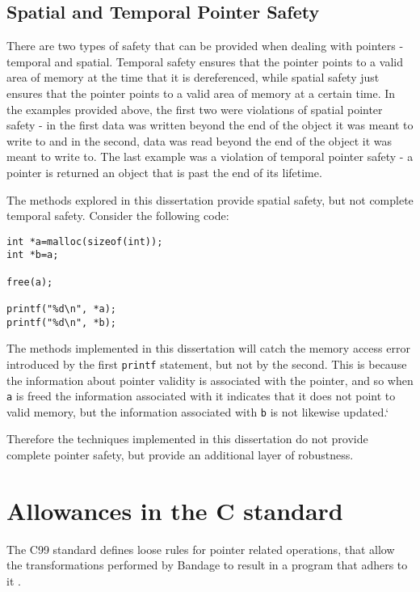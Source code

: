 \subsection{Spatial and Temporal Pointer Safety}

There are two types of safety that can be provided when dealing with pointers - temporal and spatial.
Temporal safety ensures that the pointer points to a valid area of memory at the time that it is dereferenced, while spatial safety just ensures that the pointer points to a valid area of memory at a certain time.
In the examples provided above, the first two were violations of spatial pointer safety - in the first data was written beyond the end of the object it was meant to write to and in the second, data was read beyond the end of the object it was meant to write to.
The last example was a violation of temporal pointer safety - a pointer is returned an object that is past the end of its lifetime.

The methods explored in this dissertation provide spatial safety, but not complete temporal safety.
Consider the following code:

\begin{verbatim}
int *a=malloc(sizeof(int));
int *b=a;

free(a);

printf("%d\n", *a);
printf("%d\n", *b);
\end{verbatim}

The methods implemented in this dissertation will catch the memory access error introduced by the first \verb!printf! statement, but not by the second.
This is because the information about pointer validity is associated with the pointer, and so when \verb!a! is freed the information associated with it indicates that it does not point to valid memory, but the information associated with \verb!b! is not likewise updated.`

Therefore the techniques implemented in this dissertation do not provide complete pointer safety, but provide an additional layer of robustness.

\section{Allowances in the C standard}

The C99 standard defines loose rules for pointer related operations, that allow the transformations performed by Bandage to result in a program that adhers to it \cite{c99all}.

